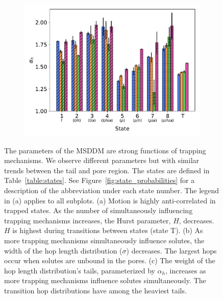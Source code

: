\documentclass[aps,pre,preprint,groupedaddress,longbibliography]{revtex4-2}
\begin{document}
\begin{figure}
\begin{subfigure}{0.325\textwidth}
  \includegraphics[width=\textwidth]{alpha_v_state.pdf}
  \caption{}\label{fig:alpha_v_state}
  \end{subfigure}
  \caption{The parameters of the MSDDM are strong functions of trapping mechanisms.
  We observe different parameters but with similar trends between the tail and pore
  region. The states are defined in Table~\ref{table:states}. See Figure~\ref{fig:state_probabilities}
  for a description of the abbreviation under each state number. The legend in (a) applies to all subplots. (a) Motion is
  highly anti-correlated in trapped states. As the number of simultaneously influencing
  trapping mechanisms increases, the Hurst parameter, $H$, decreases. $H$ is
  highest during transitions between states (state T). (b) As more trapping mechanisms
  simultaneously influence solutes, the width of the hop length distribution ($\sigma$) decreases.
  The largest hops occur when solutes are unbound in the pores. (c) The weight of the 
  hop length distribution's tails, parameterized by $\alpha_h$, increases as more trapping
  mechanisms influence solutes simultaneously. The transition hop distributions have
  among the heaviest tails.}\label{fig:msddm_parameters}
  \end{figure}
\end{document}

